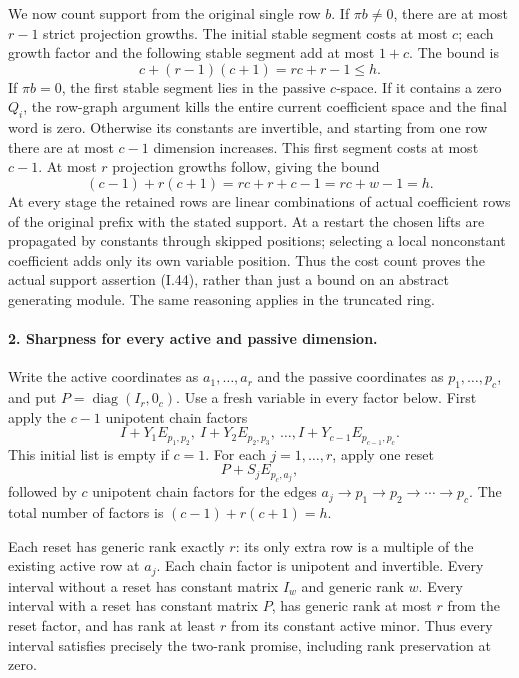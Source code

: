 We now count support from the original single row $b$.
If $\pi b\ne0$, there are at most $r-1$ strict projection
growths.  The initial stable segment costs at most $c$;
each growth factor and the following stable segment add at
most $1+c$.  The bound is
\[
 c+(r-1)(c+1)=rc+r-1\le h.
\]
If $\pi b=0$, the first stable segment lies in the passive
$c$-space.  If it contains a zero $Q_i$, the row-graph
argument kills the entire current coefficient space and the
final word is zero.  Otherwise its constants are invertible,
and starting from one row there are at most $c-1$ dimension
increases.  This first segment costs at most $c-1$.
At most $r$ projection growths follow, giving the bound
\[
 (c-1)+r(c+1)=rc+r+c-1=rc+w-1=h.
\]
At every stage the retained rows are linear combinations of
actual coefficient rows of the original prefix with the
stated support.  At a restart the chosen lifts are propagated
by constants through skipped positions; selecting a local
nonconstant coefficient adds only its own variable position.
Thus the cost count proves the actual support assertion
(I.44), rather than just a bound on an abstract generating
module.  The same reasoning applies in the truncated ring.

\paragraph{2. Sharpness for every active and passive dimension.}
Write the active coordinates as $a_1,\ldots,a_r$ and the
passive coordinates as $p_1,\ldots,p_c$, and put
$P=\operatorname{diag}(I_r,0_c)$.
Use a fresh variable in every factor below.
First apply the $c-1$ unipotent chain factors
\[
 I+Y_1E_{p_1,p_2},\ I+Y_2E_{p_2,p_3},\ \ldots,
 I+Y_{c-1}E_{p_{c-1},p_c}.
\]
This initial list is empty if $c=1$.
For each $j=1,\ldots,r$, apply one reset
\[
 P+S_jE_{p_c,a_j},
\]
followed by $c$ unipotent chain factors for the edges
$a_j\to p_1\to p_2\to\cdots\to p_c$.
The total number of factors is
$(c-1)+r(c+1)=h$.

Each reset has generic rank exactly $r$: its only extra
row is a multiple of the existing active row at $a_j$.
Each chain factor is unipotent and invertible.  Every
interval without a reset has constant matrix $I_w$ and
generic rank $w$.  Every interval with a reset has constant
matrix $P$, has generic rank at most $r$ from the reset
factor, and has rank at least $r$ from its constant active
minor.  Thus every interval satisfies precisely the
two-rank promise, including rank preservation at zero.

